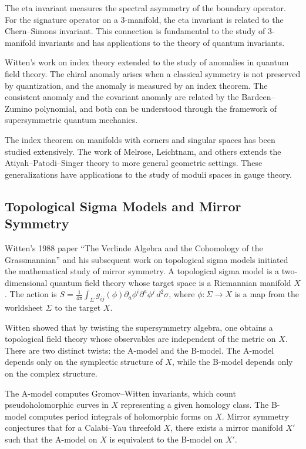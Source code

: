 The eta invariant measures the spectral asymmetry of the boundary operator. For the signature operator on a 3-manifold, the eta invariant is related to the Chern--Simons invariant. This connection is fundamental to the study of 3-manifold invariants and has applications to the theory of quantum invariants.

Witten's work on index theory extended to the study of anomalies in quantum field theory. The chiral anomaly arises when a classical symmetry is not preserved by quantization, and the anomaly is measured by an index theorem. The consistent anomaly and the covariant anomaly are related by the Bardeen--Zumino polynomial, and both can be understood through the framework of supersymmetric quantum mechanics.

The index theorem on manifolds with corners and singular spaces has been studied extensively. The work of Melrose, Leichtnam, and others extends the Atiyah--Patodi--Singer theory to more general geometric settings. These generalizations have applications to the study of moduli spaces in gauge theory.

\subsection{Topological Sigma Models and Mirror Symmetry}

Witten's 1988 paper ``The Verlinde Algebra and the Cohomology of the Grassmannian'' and his subsequent work on topological sigma models initiated the mathematical study of mirror symmetry. A topological sigma model is a two-dimensional quantum field theory whose target space is a Riemannian manifold $X$. The action is $S = \frac{1}{4\pi} \int_\Sigma g_{ij}(\phi) \partial_a \phi^i \partial^a \phi^j \, d^2\sigma$, where $\phi: \Sigma \to X$ is a map from the worldsheet $\Sigma$ to the target $X$.

Witten showed that by twisting the supersymmetry algebra, one obtains a topological field theory whose observables are independent of the metric on $X$. There are two distinct twists: the A-model and the B-model. The A-model depends only on the symplectic structure of $X$, while the B-model depends only on the complex structure.

The A-model computes Gromov--Witten invariants, which count pseudoholomorphic curves in $X$ representing a given homology class. The B-model computes period integrals of holomorphic forms on $X$. Mirror symmetry conjectures that for a Calabi--Yau threefold $X$, there exists a mirror manifold $X'$ such that the A-model on $X$ is equivalent to the B-model on $X'$.

